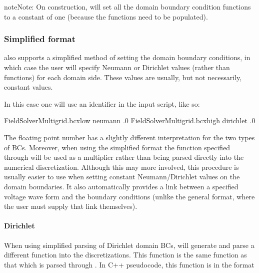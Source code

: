 \documentclass[letterpaper,10pt,english]{sphinxmanual}
\begin{document}
\begin{sphinxadmonition}{note}{Note:}
On construction,  will set all the domain boundary condition functions to a constant of one (because the functions need to be populated).
\end{sphinxadmonition}


\subsubsection{Simplified format}
\label{\detokenize{Solvers/Electrostatics:simplified-format}}
 also supports a simplified method of setting the domain boundary conditions, in which case the user will specify Neumann or Dirichlet values (rather than functions) for each domain side.
These values are usually, but not necessarily, constant values.

In this case one will use an identifier  in the input script, like so:

\begin{sphinxVerbatim}[commandchars=\\\{\},formatcom=\scriptsize]
FieldSolverMultigrid.bc\PYGZus{}x\PYGZus{}low   neumann   .0
FieldSolverMultigrid.bc\PYGZus{}x\PYGZus{}high  dirichlet .0
\end{sphinxVerbatim}

The floating point number has a slightly different interpretation for the two types of BCs.
Moreover, when using the simplified format the function specified through  will be used as a multiplier rather than being parsed directly into the numerical discretization.
Although this may  more involved, this procedure is usually easier to use when setting constant Neumann/Dirichlet values on the domain boundaries.
It also automatically provides a link between a specified voltage wave form and the boundary conditions (unlike the general format, where the user must supply that link themselves).


\paragraph{Dirichlet}
\label{\detokenize{Solvers/Electrostatics:dirichlet}}
When using simplified parsing of Dirichlet domain BCs,  will generate and parse a different function into the discretizations.
This function is  the same function as that which is parsed through .
In C++ pseudo\sphinxhyphen{}code, this function is in the format
\end{document}
